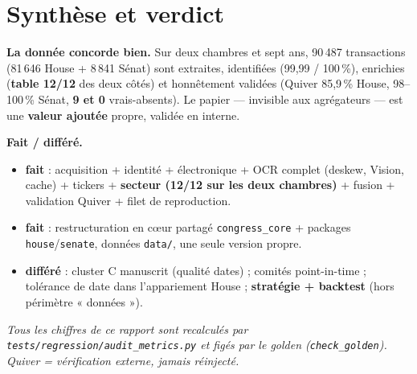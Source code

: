 \documentclass[11pt,a4paper]{article}
\newcommand{\xfait}{\textcolor{green!50!black}{\textbf{fait}}}
\newcommand{\xdif}{\textcolor{orange!80!black}{\textbf{différé}}}
\newcommand{\code}[1]{\texttt{\small #1}}
\begin{document}
\section{Synthèse et verdict}

\textbf{La donnée concorde bien.} Sur deux chambres et sept ans, 90\,487 transactions (81\,646 House +
8\,841 Sénat) sont extraites, identifiées (99,99 / 100\,\%), enrichies (\textbf{table 12/12} des deux
côtés) et honnêtement validées (Quiver 85,9\,\% House, 98--100\,\% Sénat, \textbf{9 et 0} vrais-absents).
Le papier --- invisible aux agrégateurs --- est une \textbf{valeur ajoutée} propre, validée en interne.

\textbf{Fait / différé.}
\begin{itemize}[nosep,leftmargin=1.4em]
\item \xfait{} : acquisition + identité + électronique + OCR complet (deskew, Vision, cache) + tickers +
\textbf{secteur (12/12 sur les deux chambres)} + fusion + validation Quiver + filet de reproduction.
\item \xfait{} : restructuration en c\oe{}ur partagé \code{congress\_core} + packages \code{house}/\code{senate},
données \code{data/}, une seule version propre.
\item \xdif{} : cluster C manuscrit (qualité dates) ; comités point-in-time ; tolérance de date dans
l'appariement House ; \textbf{stratégie + backtest} (hors périmètre « données »).
\end{itemize}

\vfill
\begin{center}\footnotesize\itshape
Tous les chiffres de ce rapport sont recalculés par \code{tests/regression/audit\_metrics.py} et figés
par le golden (\code{check\_golden}). Quiver = vérification externe, jamais réinjecté.
\end{center}
\end{document}
